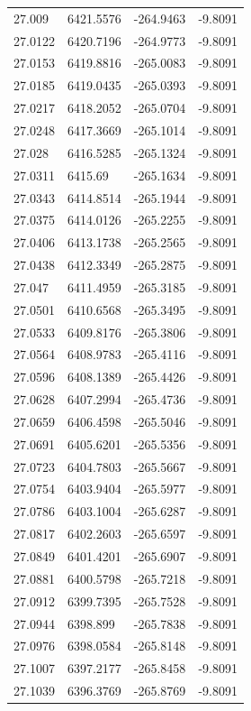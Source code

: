 \begin{table}[H]
\begin{tabular}{llll}
27.009 & 6421.5576 & -264.9463 & -9.8091 \\
27.0122 & 6420.7196 & -264.9773 & -9.8091 \\
27.0153 & 6419.8816 & -265.0083 & -9.8091 \\
27.0185 & 6419.0435 & -265.0393 & -9.8091 \\
27.0217 & 6418.2052 & -265.0704 & -9.8091 \\
27.0248 & 6417.3669 & -265.1014 & -9.8091 \\
27.028 & 6416.5285 & -265.1324 & -9.8091 \\
27.0311 & 6415.69 & -265.1634 & -9.8091 \\
27.0343 & 6414.8514 & -265.1944 & -9.8091 \\
27.0375 & 6414.0126 & -265.2255 & -9.8091 \\
27.0406 & 6413.1738 & -265.2565 & -9.8091 \\
27.0438 & 6412.3349 & -265.2875 & -9.8091 \\
27.047 & 6411.4959 & -265.3185 & -9.8091 \\
27.0501 & 6410.6568 & -265.3495 & -9.8091 \\
27.0533 & 6409.8176 & -265.3806 & -9.8091 \\
27.0564 & 6408.9783 & -265.4116 & -9.8091 \\
27.0596 & 6408.1389 & -265.4426 & -9.8091 \\
27.0628 & 6407.2994 & -265.4736 & -9.8091 \\
27.0659 & 6406.4598 & -265.5046 & -9.8091 \\
27.0691 & 6405.6201 & -265.5356 & -9.8091 \\
27.0723 & 6404.7803 & -265.5667 & -9.8091 \\
27.0754 & 6403.9404 & -265.5977 & -9.8091 \\
27.0786 & 6403.1004 & -265.6287 & -9.8091 \\
27.0817 & 6402.2603 & -265.6597 & -9.8091 \\
27.0849 & 6401.4201 & -265.6907 & -9.8091 \\
27.0881 & 6400.5798 & -265.7218 & -9.8091 \\
27.0912 & 6399.7395 & -265.7528 & -9.8091 \\
27.0944 & 6398.899 & -265.7838 & -9.8091 \\
27.0976 & 6398.0584 & -265.8148 & -9.8091 \\
27.1007 & 6397.2177 & -265.8458 & -9.8091 \\
27.1039 & 6396.3769 & -265.8769 & -9.8091 \\

\end{tabular}
\end{table}
